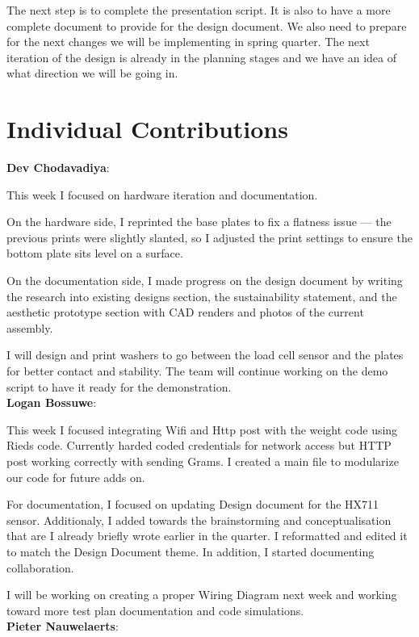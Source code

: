 \documentclass[12pt]{article}
\begin{document}
The next step is to complete the presentation script. It is also to have a more complete document to provide for the design document. We also need to prepare for the next changes we will be implementing in spring quarter. The next iteration of the design is already in the planning stages and we have an idea of what direction we will be going in. 

\section*{Individual Contributions}

\noindent\textbf{Dev Chodavadiya}:

This week I focused on hardware iteration and documentation. 

On the hardware side, I reprinted the base plates to fix a flatness issue — the previous prints were slightly slanted, so I adjusted the print settings to ensure the bottom plate sits level on a surface. 

On the documentation side, I made progress on the design document by writing the research into existing designs section, the sustainability statement, and the aesthetic prototype section with CAD renders and photos of the current assembly.

I will design and print washers to go between the load cell sensor and the plates for better contact and stability. The team will continue working on the demo script to have it ready for the demonstration.\\


\noindent\textbf{Logan Bossuwe}:

This week I focused integrating Wifi and Http post with the weight code using Rieds code. Currently harded coded credentials for network access but HTTP post working correctly with sending Grams. I created a main file to modularize our code for future adds on.

For documentation, I focused on updating Design document for the HX711 sensor. Additionaly, I added towards the brainstorming and conceptualisation that are I already briefly wrote earlier in the quarter. I reformatted and edited it to match the Design Document theme. In addition, I started documenting collaboration.

I will be working on creating a proper Wiring Diagram next week and working toward more test plan documentation and code simulations.\\
\noindent\textbf{Pieter Nauwelaerts}:
\end{document}
